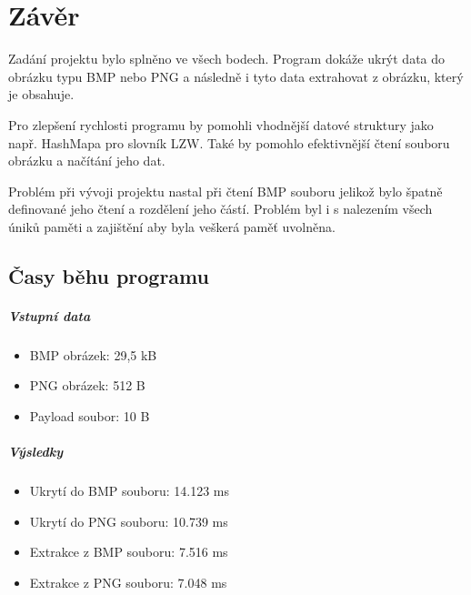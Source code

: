 \documentclass[12pt]{report}
\begin{document}


    \chapter{Závěr}
    Zadání projektu bylo splněno ve všech bodech. Program dokáže ukrýt data do obrázku typu BMP nebo PNG a následně i tyto data extrahovat z obrázku, který je obsahuje.

    Pro zlepšení rychlosti programu by pomohli vhodnější datové struktury jako např. HashMapa pro slovník LZW. Také by pomohlo efektivnější čtení souboru obrázku a načítání jeho dat.

    Problém při vývoji projektu nastal při čtení BMP souboru jelikož bylo špatně definované jeho čtení a rozdělení jeho částí. Problém byl i s nalezením všech úniků paměti a zajištění aby byla veškerá paměť uvolněna.


    \section{Časy běhu programu}

    \paragraph{Vstupní data}


    \begin{itemize}
        \item BMP obrázek: 29,5 kB
        \item PNG obrázek: 512 B
        \item Payload soubor: 10 B
    \end{itemize}

    \paragraph{Výsledky}
    \begin{itemize}
        \item Ukrytí do BMP souboru: 14.123 ms
        \item Ukrytí do PNG souboru: 10.739 ms
        \item Extrakce z BMP souboru: 7.516 ms
        \item Extrakce z PNG souboru: 7.048 ms
    \end{itemize}

    
    

    \listoffigures
\end{document}
